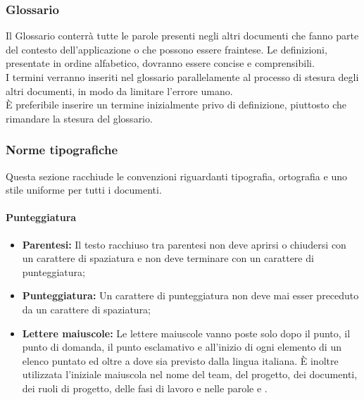 \subsubsection{Glossario}
  Il Glossario conterrà tutte le parole presenti negli altri documenti che fanno parte del contesto dell'applicazione o che possono essere fraintese. Le definizioni, presentate in
  ordine alfabetico, dovranno essere concise e comprensibili.\\
  I termini verranno inseriti nel glossario parallelamente al processo di stesura degli altri documenti, in modo da limitare l'errore umano.\\
  È preferibile inserire un termine inizialmente privo di definizione, piuttosto che rimandare la stesura del glossario.

    \subsubsection{Norme tipografiche}
      Questa sezione racchiude le convenzioni riguardanti tipografia, ortografia e uno stile uniforme per tutti i documenti.
      \paragraph{Punteggiatura}
        \begin{itemize}
          \item \textbf{Parentesi: }Il testo racchiuso tra parentesi non deve aprirsi o chiudersi con un carattere di spaziatura e non deve terminare con un carattere di punteggiatura;
          \item \textbf{Punteggiatura: }Un carattere di punteggiatura non deve mai esser preceduto da un carattere di spaziatura;
          \item \textbf{Lettere maiuscole: }Le lettere maiuscole vanno poste solo dopo il punto, il punto di domanda, il punto esclamativo e all’inizio di ogni elemento di un elenco puntato ed
          oltre a dove sia previsto dalla lingua italiana. È inoltre utilizzata l’iniziale maiuscola nel nome del team, del progetto, dei documenti, dei ruoli di progetto, delle fasi di
          lavoro e nelle parole  e .
        \end{itemize}
